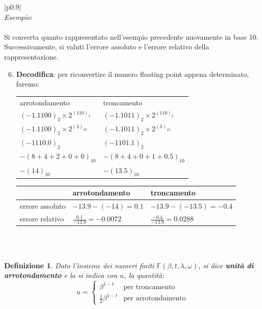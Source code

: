 \documentclass{article}
\newtheorem*{definition}{\color{red}\textbf{Definizione}}
\newenvironment{example}
{\begin{center}
        \begin{tabular}{|p{0.9\textwidth}|}
            \hline \\ 
            \textit{Esempio}: \\\\ 
        }
        {
            \\\\ \hline
        \end{tabular}
    \end{center}
}
\begin{document}
\begin{example}
    Si converta quanto rappresentato nell'esempio precedente nuovamente in
    base 10. Successivamente, si valuti l'errore assoluto e l'errore relativo
    della rappresentazione.
    \begin{enumerate}
        \setcounter{enumi}{5}
        \item\textbf{Decodifica}: per riconvertire il numero floating point
            appena determinato, faremo:
            \begin{center}
                 \begin{tabular}{ll}
                     arrotondamento & troncamento \\ 
                     $(-1.1100)_2\times2^{(110)_2}$ & $(-1.1011)_2\times2^{(110)_2}$ \\ 
                     $(-1.1100)_2\times2^{(3)_{10}}$ & $(-1.1011)_2\times2^{(3)_{10}}$ \\ 
                     $(-1110.0)_2$ & $(-1101.1)_2$ \\ 
                     $-(8+4+2+0+0)_{10}$ & $-(8+4+0+1+0.5)_{10}$ \\ 
                     $-(14)_{10}$ & $-(13.5)_{10}$ \\ 
                 \end{tabular}
            \end{center}
            \begin{center}
                \begin{tabular}{l|l|l}
                    & arrotondamento & troncamento \\
                    \hline
                    errore assoluto & $-13.9 - (-14) = 0.1$ & $-13.9 - (-13.5) = -0.4$ \\
                    \hline
                    errore relativo & $\frac{0.1}{-13.9} = -0.0072$ & $\frac{-0.4}{-13.9} = 0.0288$
                \end{tabular} 
            \end{center}
   \end{enumerate} 
\end{example}
\begin{definition}
    Dato l'insieme dei numeri finiti $\mathbb{F}(\beta,t,\lambda,\omega)$, si
    dice \textbf{unità di arrotondamento} e la si indica con $u$, la quantità:
    $$u=\begin{cases}
        \beta^{1-t} & \text{per troncamento} \\ 
        \frac{1}{2}\beta^{1-t} & \text{per arrotondamento}
    \end{cases}$$
\end{definition}
\end{document}
